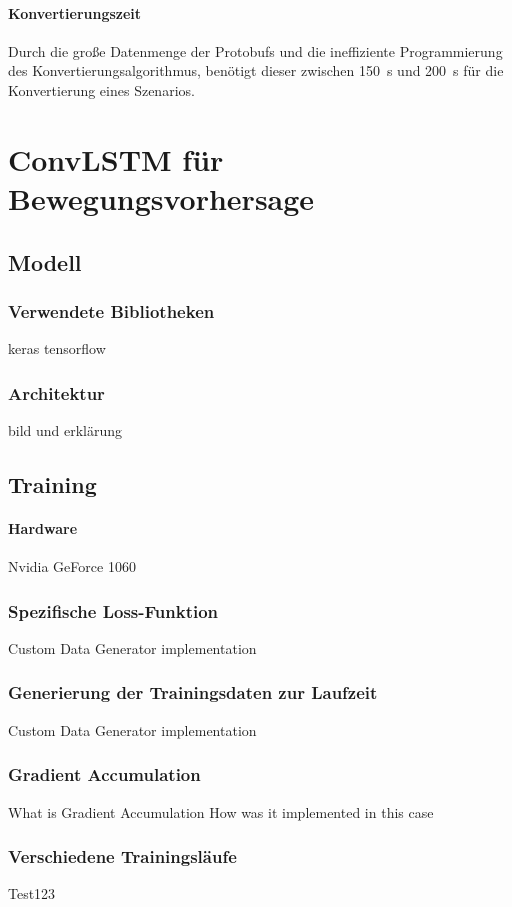 \documentclass[12pt]{article}
\begin{document}
        \paragraph{Konvertierungszeit} Durch die große Datenmenge der Protobufs und die ineffiziente Programmierung des Konvertierungsalgorithmus, 
        benötigt dieser zwischen 150~s und 200~s für die Konvertierung eines Szenarios.

\pagebreak
\section{ConvLSTM für Bewegungsvorhersage}
    \subsection{Modell}
        \subsubsection{Verwendete Bibliotheken}
            keras
            tensorflow
        \subsubsection{Architektur}
            bild und erklärung
    \subsection{Training}
        \paragraph{Hardware} Nvidia GeForce 1060
        \subsubsection{Spezifische Loss-Funktion}
	        Custom Data Generator implementation
        \subsubsection{Generierung der Trainingsdaten zur Laufzeit}
	        Custom Data Generator implementation
        
        \subsubsection{Gradient Accumulation}
		    What is Gradient Accumulation
            How was it implemented in this case
        \subsubsection{Verschiedene Trainingsläufe}
            Test123
\pagebreak
\end{document}
